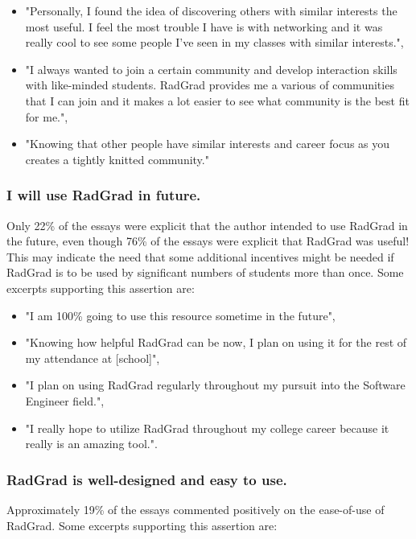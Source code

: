 \documentclass[acmsmall]{acmart}
\begin{document}
\begin{itemize}[leftmargin=*]
\item "Personally, I found the idea of discovering others with similar interests the most useful. I feel the most trouble I have is with networking and it was really cool to see some people I've seen in my classes with similar interests.",
\item "I always wanted to join a certain community and develop interaction skills with like-minded students. RadGrad provides me a various of communities that I can join and it makes a lot easier to see what community is the best fit for me.",
\item "Knowing that other people have similar interests and career focus as you creates a tightly knitted community."
\end{itemize}

\subsubsection{I will use RadGrad in future.}  Only 22\% of the essays were explicit that the author intended to use RadGrad in the future, even though 76\% of the essays were explicit that RadGrad was useful!  This may indicate the need that some additional incentives might be needed if RadGrad is to be used by significant numbers of students more than once. Some excerpts supporting this assertion are:

\begin{itemize}[leftmargin=*]
\item "I am 100\% going to use this resource sometime in the future",
\item "Knowing how helpful RadGrad can be now, I plan on using it for the rest of my attendance at [school]",
\item "I plan on using RadGrad regularly throughout my pursuit into the Software Engineer field.",
\item "I really hope to utilize RadGrad throughout my college career because it really is an amazing tool.".
\end{itemize}

\subsubsection{RadGrad is well-designed and easy to use.}  Approximately 19\% of the essays commented positively on the ease-of-use of RadGrad.
Some excerpts supporting this assertion are:
\end{document}
